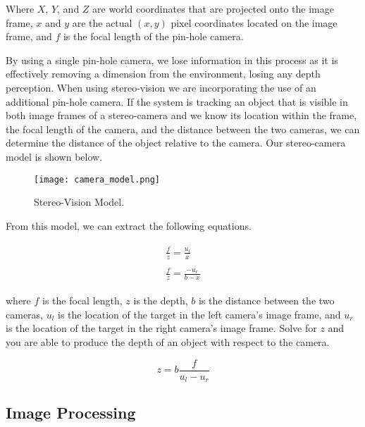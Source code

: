 \documentclass[12pt]{article}
\begin{document}
Where $X$, $Y$, and $Z$ are world coordinates that are projected onto the image frame, $x$ and $y$ are the actual $(x,y)$ pixel coordinates located on the image frame, and $f$ is the focal length of the pin-hole camera. 

By using a single pin-hole camera, we lose information in this process as it is effectively removing a dimension from the environment, losing any depth perception. When using stereo-vision we are incorporating the use of an additional pin-hole camera. If the system is tracking an object that is visible in both image frames of a stereo-camera and we know its location within the frame, the focal length of the camera, and the distance between the two cameras, we can determine the distance of the object relative to the camera. Our stereo-camera model is shown below.

\begin{figure}[htp!]
	\begin{center}
		\texttt{[image: camera\_model.png]}
		\caption{Stereo-Vision Model.}  \label{fig.stereo}
	\end{center}
\end{figure}

From this model, we can extract the following equations.

\begin{eqnarray}
	\begin{array}{ll}
		\frac{f}{z} = \frac{u_{l}}{x} \\ \\
		\frac{f}{z} = \frac{-u_{r}}{b-x}
	\end{array}
\end{eqnarray}

where $f$ is the focal length, $z$ is the depth, $b$ is the distance between the two cameras, $u_l$ is the location of the target in the left camera's image frame, and $u_r$ is the location of the target in the right camera's image frame. Solve for $z$ and you are able to produce the depth of an object with respect to the camera.

\begin{equation}
	z = b\frac{f}{u_{l} - u_{r}} 
\end{equation}	\label{eq:stereovision}



\subsection{Image Processing} \label{sec:imagepro}
\end{document}
